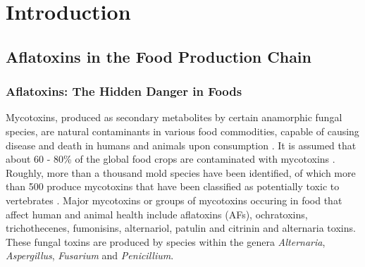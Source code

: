 \chapter{Introduction} \label{Introduction} 

\clearpage

\section{Aflatoxins in the Food Production Chain} \label{subchap:AFs_introduction}

\subsection{Aflatoxins: The Hidden Danger in Foods} \label{subchap:mycotoxins}

Mycotoxins, produced as secondary metabolites by certain anamorphic fungal species, are natural contaminants in various food commodities, capable of causing disease and death in humans and animals upon consumption \citep{bennett2003clinical}. It is assumed that about 60 - 80\% of the global food crops are contaminated with mycotoxins \citep{eskola2020worldwide}. Roughly, more than a thousand mold species have been identified, of which more than 500 produce mycotoxins that have been classified as potentially toxic to vertebrates \citep{haque2020mycotoxin}. Major mycotoxins or groups of mycotoxins occuring in food that affect human and animal health include aflatoxins (AFs), ochratoxins, trichothecenes, fumonisins, alternariol, patulin and citrinin and alternaria toxins. These fungal toxins are produced by species within the genera \textit{Alternaria}, \textit{Aspergillus}, \textit{Fusarium} and \textit{Penicillium}. 


